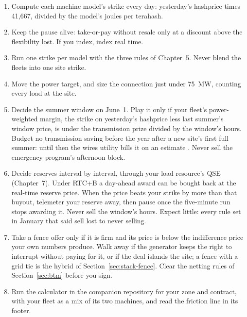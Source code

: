 \begin{enumerate}
  \item Compute each machine model's strike every day: yesterday's hashprice times 41,667, divided by the model's joules per terahash.
  \item Keep the pause alive: take-or-pay without resale only at a discount above the flexibility lost. If you index, index real time.
  \item Run one strike per model with the three rules of Chapter~5. Never blend the fleets into one site strike.
  \item Move the power target, and size the connection just under 75~MW, counting every load at the site. %
  \item Decide the summer window on June~1. Play it only if your fleet's power-weighted margin, the strike on yesterday's hashprice less last summer's window price, is under the transmission prize divided by the window's hours. Budget no transmission saving before the year after a new site's first full summer: until then the wires utility bills it on an estimate \autocite{oncor2026retailtariff,centerpoint2026retailtariff}. Never sell the emergency program's afternoon block.
  \item Decide reserves interval by interval, through your load resource's QSE (Chapter~7). Under RTC+B a day-ahead award can be bought back at the real-time reserve price. When the price beats your strike by more than that buyout, telemeter your reserve away, then pause once the five-minute run stops awarding it. Never sell the window's hours. Expect little: every rule set in January that said sell lost to never selling.
  \item {} Take a fence offer only if it is firm and its price is below the indifference price your own numbers produce. Walk away if the generator keeps the right to interrupt without paying for it, or if the deal islands the site; a fence with a grid tie is the hybrid of Section~\ref{sec:stack-fence}. Clear the netting rules of Section~\ref{sec:btm} before you sign.
  \item Run the calculator in the companion repository for your zone and contract, with your fleet as a mix of its two machines, and read the friction line in its footer.
\end{enumerate}

